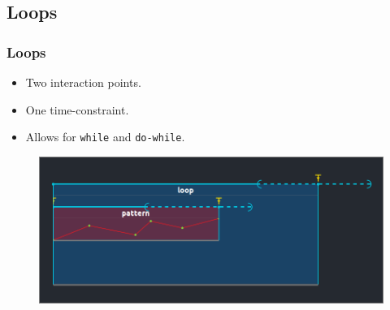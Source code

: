 \documentclass{beamer}
\begin{document}
\subsection{Loops}
\begin{frame}
    \frametitle{Loops}  
    \Large
    \begin{itemize}
        \item Two interaction points.
        \item One time-constraint.
        \item Allows for \texttt{while} and \texttt{do-while}.
    \end{itemize}
    
    \begin{figure}
        \includegraphics[width=\textwidth]{images/loop.png}
    \end{figure}
\end{frame}
\end{document}
